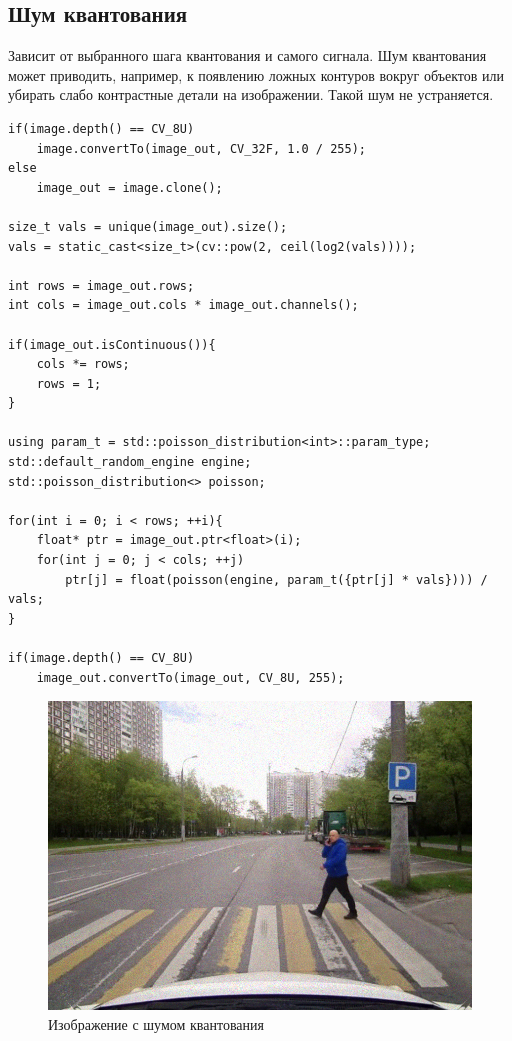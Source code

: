 \pagebreak

\subsection{Шум квантования}

Зависит от выбранного шага квантования и самого сигнала.
Шум квантования может приводить, например, к появлению ложных контуров 
вокруг объектов или убирать слабо контрастные детали на изображении. Такой шум не устраняется.


\begin{lstlisting}[style=cpp_white, caption={Исходный код для применения шума квантования к изображению}]
if(image.depth() == CV_8U)
    image.convertTo(image_out, CV_32F, 1.0 / 255);
else
    image_out = image.clone();

size_t vals = unique(image_out).size();
vals = static_cast<size_t>(cv::pow(2, ceil(log2(vals))));

int rows = image_out.rows;
int cols = image_out.cols * image_out.channels();

if(image_out.isContinuous()){
    cols *= rows;
    rows = 1;
}

using param_t = std::poisson_distribution<int>::param_type;
std::default_random_engine engine;
std::poisson_distribution<> poisson;

for(int i = 0; i < rows; ++i){
    float* ptr = image_out.ptr<float>(i);
    for(int j = 0; j < cols; ++j)
        ptr[j] = float(poisson(engine, param_t({ptr[j] * vals}))) / vals;
}

if(image.depth() == CV_8U)
    image_out.convertTo(image_out, CV_8U, 255);
\end{lstlisting}

\begin{figure}[ht]
    \includegraphics[width=\textwidth]{../outputs/image_quant_noise.png}
    \caption{Изображение с шумом квантования}
    \label{fig:impulse_image}
\end{figure}

